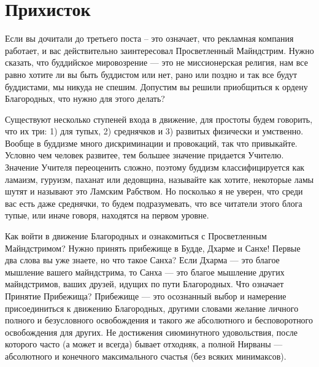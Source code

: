 \section{Прихисток}

Если вы дочитали до третьего поста -- это означает, что рекламная
компания работает, и вас действительно заинтересовал Просветленный
 Майндстрим. Нужно сказать, что буддийское мировозрение — это не
миссионерская религия, нам все равно хотите ли вы быть буддистом
или нет, рано или поздно и так все будут буддистами, мы никуда
не спешим. Допустим вы решили приобщиться к ордену Благородных,
что нужно для этого делать?

Существуют несколько ступеней входа в движение, для простоты
будем говорить, что их три: 1) для тупых, 2) среднячков и 3)
развитых физически и умственно. Вообще в буддизме много
дискриминации и провокаций, так что привыкайте. Условно
чем человек развитее, тем большее значение придается Учителю.
Значение Учителя переоценить сложно, поэтому буддизм
классифицируется как ламаизм, гуруизм, паханат или дедовщина,
называйте как хотите, некоторые ламы шутят и называют это
Ламским Рабством. Но посколько я не уверен, что среди вас
есть даже среднячки, то будем подразумевать, что все читатели
этого блога тупые, или иначе говоря, находятся на первом уровне. 

Как войти в движение Благородных и ознакомиться с Просветленным
Майндстримом? Нужно принять прибежище в Будде, Дхарме и Санхе!
Первые два слова вы уже знаете, но что такое Санха? Если
Дхарма — это благое мышление вашего майндстрима, то Санха — это
благое мышление других майндстримов, ваших друзей, идущих по
пути Благородных. Что означает Принятие Прибежища?
Прибежище — это осознанный выбор и намерение присоединиться
к движению Благородных, другими словами желание личного полного
и безусловного освобождения и такого же абсолютного и бесповоротного
освобождения для других. Не достижения сиюминутного удовольствия,
после которого часто (а может и всегда) бывает отходняк, а полной
Нирваны — абсолютного и конечного максимального счастья (без всяких минимаксов).

